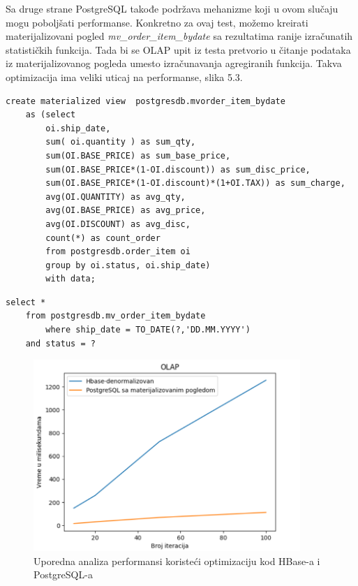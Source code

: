 \documentclass[12pt,oneside]{memoir}
\begin{document}
Sa druge strane PostgreSQL takođe podržava mehanizme koji u ovom slučaju mogu poboljšati performanse. Konkretno za ovaj test, možemo kreirati materijalizovani pogled \textit{mv\_order\_item\_bydate} sa rezultatima ranije izračunatih statističkih funkcija. Tada bi se OLAP upit iz testa pretvorio u čitanje podataka iz materijalizovanog pogleda umesto izračunavanja agregiranih funkcija. Takva optimizacija ima veliki uticaj na performanse, slika 5.3.

\pagebreak 

\begin{lstlisting}[title={mvorder\_item\_bydate},captionpos=t]
create materialized view  postgresdb.mvorder_item_bydate
    as (select
		oi.ship_date,
		sum( oi.quantity ) as sum_qty,
		sum(OI.BASE_PRICE) as sum_base_price,
		sum(OI.BASE_PRICE*(1-OI.discount)) as sum_disc_price,
		sum(OI.BASE_PRICE*(1-OI.discount)*(1+OI.TAX)) as sum_charge,
		avg(OI.QUANTITY) as avg_qty,
		avg(OI.BASE_PRICE) as avg_price,
		avg(OI.DISCOUNT) as avg_disc,
		count(*) as count_order
		from postgresdb.order_item oi
		group by oi.status, oi.ship_date)
		with data;
 \end{lstlisting}

\begin{lstlisting}[title={executeOLAPQuery},captionpos=t]
select *
	from postgresdb.mv_order_item_bydate
        where ship_date = TO_DATE(?,'DD.MM.YYYY')
	and status = ?
 \end{lstlisting}


\begin{figure}[!ht]
  \centering
  \includegraphics[width=0.9\textwidth]{mv-denormalizerd.png}
  \caption{Uporedna analiza performansi koristeći optimizaciju kod HBase-a  i PostgreSQL-a}
  \label{fig:grafikon}
\end{figure}
\end{document}
